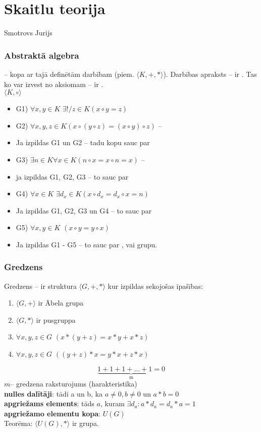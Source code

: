 \section{Skaitlu teorija}
Smotrovs Jurijs \\

\subsubsection{Abstraktā algebra}
 -- kopa ar tajā definētām darbībam (piem. $\langle K, +, * \rangle$).
Darbības apraksts -- ir . Tas ko var izvest no aksiomam -- ir . \\

$\langle K, \circ \rangle$
\begin{itemize}
  \item G1)  $\forall x,y \in K$ $\exists! / z \in K (x \circ y = z)$
  \item G2) $\forall x, y, z \in K (x \circ (y \circ z) = (x \circ y) \circ z)$ -- 
  \item Ja izpildas G1 un G2 -- tadu kopu sauc par 
  \item G3) $\exists n \in K \forall x \in K (n \circ x = x \circ n = x)$ -- 
  \item ja izpildas G1, G2, G3 -- to sauc par 
  \item G4) $\forall x \in K$  $\exists d_x \in K (x \circ d_x = d_x \circ x = n)$
  \item Ja izpildas G1, G2, G3 un G4 -- to sauc par 
  \item G5) $\forall x, y \in K $ $(x \circ y = y \circ x)$ 
  \item Ja izpildas G1 - G5 -- to sauc par , vai  grupu.
\end{itemize}

\subsubsection{Gredzens}
Gredzens -- ir struktura $\langle G, +, * \rangle$ kur izpildas sekojošas īpašības:
\begin{enumerate}
  \item $\langle G, + \rangle$ ir Ābela grupa
  \item $\langle G, * \rangle$ ir pusgruppa
  \item $\forall x,y, z \in G $ $(x * (y + z) = x * y + x * z)$
  \item $\forall x, y, z \in G$ $( (y + z) * x = y * x + z * x)$
\end{enumerate}
$$\underbrace{1 + 1 + 1 + ... + 1 = 0}_\text{m}$$
\textbf{$m$}-- gredzena raksturojums (harakteristika) \\
\textbf{nulles dalītāji}: tādi a un b, ka $a \ne 0, b \ne 0 $ un $a * b = 0$ \\
\textbf{apgriežams elements}: tāds $a$, kuram $\exists d_a: a * d_a = d_a * a = 1$ \\
\textbf{apgriežamo elementu kopa}: $U(G)$\\
Teorēma: $\langle U(G), * \rangle$ ir grupa.

